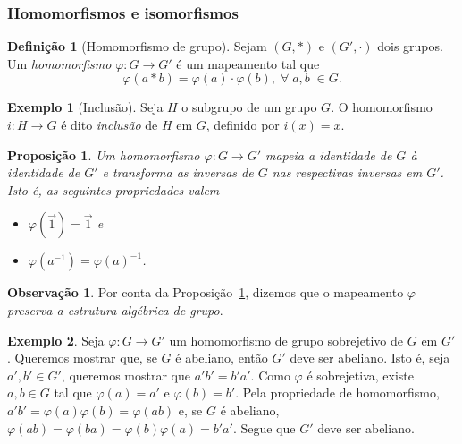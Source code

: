 \documentclass[a4paper,12pt]{report}
\theoremstyle{plain}
\newtheorem{proposicao}{Proposição}[section]
\theoremstyle{definition}
\newtheorem{definicao}{Definição}[section]
\newtheorem{observacao}{Observação}[section]
\newtheorem{exemplo}{Exemplo}[section]
\begin{document}
	\subsubsection{Homomorfismos e isomorfismos}
	
	\begin{definicao}[Homomorfismo de grupo]
		Sejam \((G,*)\) e \((G',\cdot)\) dois grupos. Um \emph{homomorfismo} \(\varphi: G\longrightarrow G'\) é um mapeamento tal que
		\begin{equation}\tag{propriedade de homomorfismo}
			\varphi(a*b) = \varphi(a)\cdot\varphi(b), \; \forall \; a,b\; \in G.
		\end{equation}
	\end{definicao}
	
	\begin{exemplo}[Inclusão]
		Seja \(H\) o subgrupo de um grupo \(G\). O homomorfismo \(i: H \longrightarrow G\) é dito \emph{inclusão} de \(H\) em \(G\), definido por \(i(x) = x\).
	\end{exemplo}
	
	\begin{proposicao}\label{prop:homo}
		 Um homomorfismo \(\varphi: G\longrightarrow G'\) mapeia a identidade de $G$ à identidade de $G'$ e transforma as inversas de $G$ nas respectivas inversas em $G'$. Isto é, as seguintes propriedades valem
		 \begin{itemize}
		 	\item \(\varphi(\vec{1}) = \vec{1}\) e 
		 	\item \(\varphi(a^{-1}) = \varphi(a)^{-1}\).	
	 	 \end{itemize}
		  
	\end{proposicao}
	
	\begin{observacao}
		Por conta da Proposição~\ref{prop:homo}, dizemos que o mapeamento $\varphi$ \emph{preserva a estrutura algébrica de grupo}.
	\end{observacao}
	
	\begin{exemplo}
		Seja $\varphi: G \longrightarrow G'$ um homomorfismo de grupo sobrejetivo de $G$ em $G'$. Queremos mostrar que, se $G$ é abeliano, então $G'$ deve ser abeliano. Isto é, seja $a',b'\in G'$, queremos mostrar que $a'b' = b'a'$. Como $\varphi$ é sobrejetiva, existe $a,b\in G$ tal que $\varphi(a) = a'$ e $\varphi(b) = b'$. Pela propriedade de homomorfismo, $a'b' = \varphi(a)\varphi(b) = \varphi(ab)$ e, se $G$ é abeliano, $\varphi(ab) = \varphi(ba) = \varphi(b)\varphi(a) = b'a'$. Segue que $G'$ deve ser abeliano.
	\end{exemplo}
	
\end{document}
